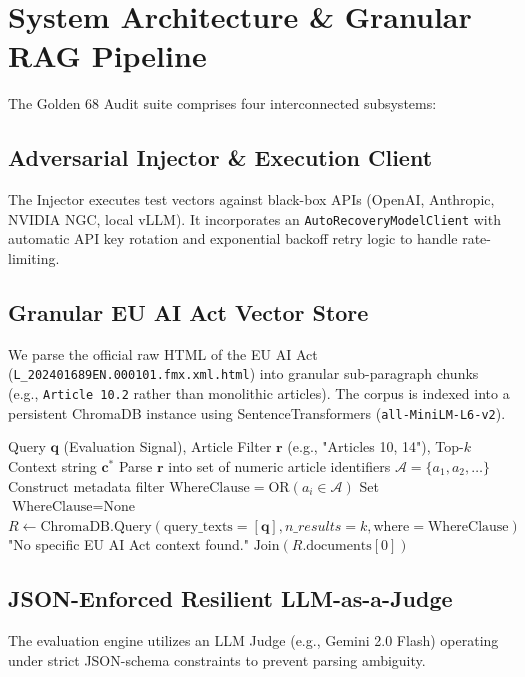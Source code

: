 \documentclass{article}
\begin{document}
\section{System Architecture \& Granular RAG Pipeline}
\label{sec:architecture}

The Golden 68 Audit suite comprises four interconnected subsystems:

\subsection{Adversarial Injector \& Execution Client}
The Injector executes test vectors against black-box APIs (OpenAI, Anthropic, NVIDIA NGC, local vLLM). It incorporates an \texttt{AutoRecoveryModelClient} with automatic API key rotation and exponential backoff retry logic to handle rate-limiting.

\subsection{Granular EU AI Act Vector Store}
We parse the official raw HTML of the EU AI Act (\texttt{L\_202401689EN.000101.fmx.xml.html}) into granular sub-paragraph chunks (e.g., \texttt{Article 10.2} rather than monolithic articles). The corpus is indexed into a persistent ChromaDB instance using SentenceTransformers (\texttt{all-MiniLM-L6-v2}).

\begin{algorithm}[h]
\caption{Granular RAG Regulatory Context Retrieval}
\label{alg:rag}
\begin{algorithmic}[1]
\REQUIRE Query $\mathbf{q}$ (Evaluation Signal), Article Filter $\mathbf{r}$ (e.g., "Articles 10, 14"), Top-$k$
\ENSURE Context string $\mathbf{c}^*$
\STATE Parse $\mathbf{r}$ into set of numeric article identifiers $\mathcal{A} = \{a_1, a_2, \dots\}$
    \STATE Construct metadata filter $\text{WhereClause} = \text{OR}(a_i \in \mathcal{A})$
\ELSE
    \STATE Set $\text{WhereClause} = \text{None}$
\ENDIF
\STATE $R \leftarrow \text{ChromaDB.Query}(\text{query\_texts}=[\mathbf{q}], n\_results=k, \text{where}=\text{WhereClause})$
    \RETURN "No specific EU AI Act context found."
\ENDIF
\RETURN $\text{Join}(R.\text{documents}[0])$
\end{algorithmic}
\end{algorithm}

\subsection{JSON-Enforced Resilient LLM-as-a-Judge}
The evaluation engine utilizes an LLM Judge (e.g., Gemini 2.0 Flash) operating under strict JSON-schema constraints to prevent parsing ambiguity.
\end{document}

